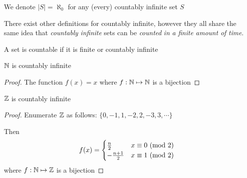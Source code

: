 \documentclass[main.tex]{subfiles}
\begin{document}
\begin{rem}
	We denote \(|S| = \aleph_0\) for any (every) countably infinite set \(S\)
\end{rem}

There exist other definitions for countably infinite, however they all share the same idea that \textit{countably infinite} sets can be \textit{counted} \textit{in a finite amount of time}.

\begin{defn}[Countable]
	A set is countable if it is finite or countably infinite
\end{defn}

\begin{example}
	\(\mathbb{N}\) is countably infinite
	
	\begin{proof}
		The function \(f(x) = x\) where \(f : \mathbb{N} \mapsto \mathbb{N}\) is a bijection
	\end{proof}
\end{example}

\begin{example}
	\(\mathbb{Z}\) is countably infinite
	
	\begin{proof}
		Enumerate \(\mathbb{Z}\) as follows: \(\{0,-1,1,-2,2,-3,3,\cdots\}\)
		
		Then \[f(x) = \begin{cases} \frac{n}{2} & x \equiv 0 \ (\mathrm{mod}\ 2) \\ -\frac{n+1}{2} & x \equiv 1 \ (\mathrm{mod}\ 2) \end{cases}\] where \(f : \mathbb{N} \mapsto \mathbb{Z}\) is a bijection
	\end{proof}
\end{example}
\end{document}
